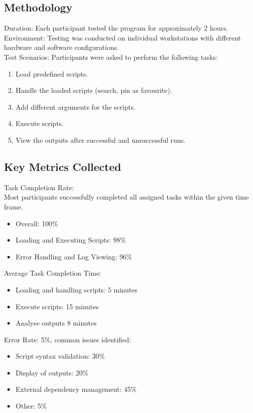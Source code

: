 \documentclass{article}
\begin{document}
\subsection{Methodology}
Duration: Each participant tested the program for approximately 2 hours. \\
Environment: Testing was conducted on individual workstations with different hardware and software configurations. \\
Test Scenarios: Participants were asked to perform the following tasks:
\begin{enumerate}
    \item Load predefined scripts.
    \item Handle the loaded scripts (search, pin as favourite).
    \item Add different arguments for the scripts.
    \item Execute scripts.
    \item View the outputs after successful and unsuccessful runs.
\end{enumerate}

\subsection{Key Metrics Collected}
Task Completion Rate: \\
Most participants successfully completed all assigned tasks within the given time frame.
\begin{itemize}
    \item Overall: 100\%
    \item Loading and Executing Scripts: 98\%
    \item Error Handling and Log Viewing: 96\%
\end{itemize}

\noindent Average Task Completion Time:
\begin{itemize}
    \item Loading and handling scripts: 5 minutes
    \item Execute scripts: 15 minutes
    \item Analyse outputs 8 minutes
\end{itemize}

\noindent Error Rate: 5\%, common issues identified:
\begin{itemize}
    \item Script syntax validation: 30\%
    \item Display of outputs: 20\%
    \item External dependency management: 45\%
    \item Other: 5\%
\end{itemize}
\end{document}
